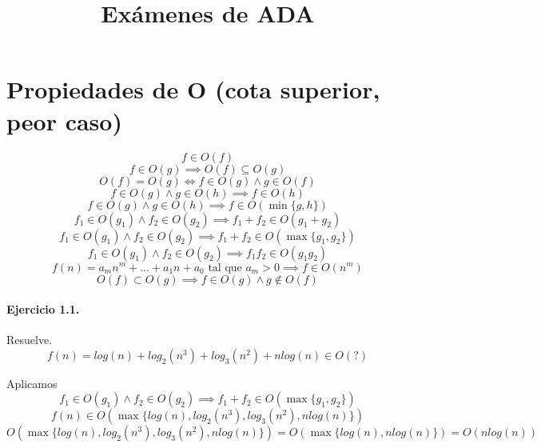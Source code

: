 \documentclass{article}
\title{Exámenes de ADA}
\begin{document}
	\section{Propiedades de O (cota superior, peor caso)}
	{\LARGE
	\begin{equation}
		f \in O(f)
	\end{equation}
	\begin{equation}
		f \in O(g) \implies O(f) \subseteq O(g)
	\end{equation}
	\begin{equation}
		O(f) = O(g) \iff f \in O(g) \land g \in O(f)
	\end{equation}
	\begin{equation}
		f \in O(g) \land g \in O(h) \implies f \in O(h) 
	\end{equation}
	\begin{equation}
		f \in O(g) \land g \in O(h) \implies f \in O(\min \{g, h\})
	\end{equation}
	\begin{equation}
		f_1 \in O(g_1) \land f_2 \in O(g_2) \implies f_1 + f_2 \in O(g_1 + g_2) 
	\end{equation}
	\begin{equation}
		f_1 \in O(g_1) \land f_2 \in O(g_2) \implies f_1 + f_2 \in O(\max \{g_1, g_2\})
	\end{equation}
	\begin{equation}
		f_1 \in O(g_1) \land f_2 \in O(g_2) \implies f_1 f_2 \in O(g_1 g_2)
	\end{equation}	
	\begin{equation}
		f(n) = a_m n^m + ... + a_1 n + a_0 \text{ tal que } a_m > 0 \implies f \in O(n^m)
	\end{equation}	
	\begin{equation}
		O(f) \subset O(g) \implies f \in O(g) \land g \notin O(f)
	\end{equation}	
	}
	
	\paragraph{Ejercicio 1.1.} Resuelve.
	{\LARGE
	\begin{displaymath}
		f(n)=log (n) + log_2 (n^3) + log_3 (n^2) + n log(n) \in O(?)
	\end{displaymath}
	}
	
	Aplicamos
	\begin{displaymath}
		f_1 \in O(g_1) \land f_2 \in O(g_2) \implies f_1 + f_2 \in O(\max \{g_1, g_2\})
	\end{displaymath}
	\begin{displaymath}
		f(n) \in O(\max \{log(n), log_2(n^3), log_3(n^2), nlog(n)\})
	\end{displaymath}
	\begin{displaymath}
		O(\max \{log(n), log_2(n^3), log_3(n^2), nlog(n)\}) = O(\max \{log(n), n log(n)\}) = O(n log(n))
	\end{displaymath}
	
\end{document}
